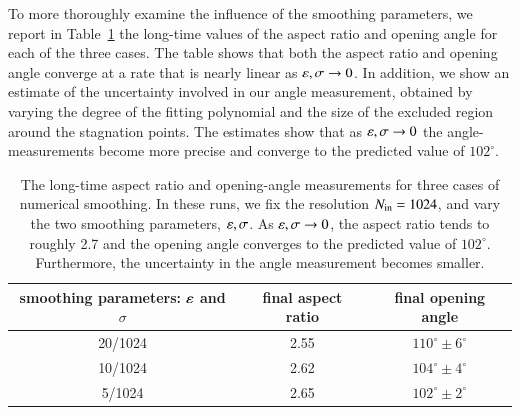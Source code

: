 \documentclass[preprint, 10pt]{elsarticle}
\begin{document}
To more thoroughly examine the influence of the smoothing parameters, we report in Table~\ref{table:arangle} the long-time values of the aspect ratio and opening angle for each of the three cases. The table shows that both the aspect ratio and opening angle converge at a rate that is nearly linear as $\varepsilon, \sigma \to 0$. In addition, we show an estimate of the uncertainty involved in our angle measurement, obtained by varying the degree of the fitting polynomial and the size of the excluded region around the stagnation points. The estimates show that as $\varepsilon, \sigma \to 0$ the angle-measurements become more precise and converge to the predicted value of $102^{\circ}$.  

\begin{table}%
\begin{center}
\caption{The long-time aspect ratio and opening-angle measurements for three cases of numerical smoothing. In these runs, we fix the resolution $N_{\mathrm{in}} = 1024$, and vary the two smoothing parameters, $\varepsilon, \sigma$. As $\varepsilon, \sigma \to 0$, the aspect ratio tends to roughly 2.7 and the opening angle converges to the predicted value of $102^{\circ}$. Furthermore, the uncertainty in the angle measurement becomes smaller.
} 
\vspace{0.3 pc}
\label{table:arangle}
\begin{tabular}{c c c}
\hline
\hspace{0.5pc} smoothing parameters: $\varepsilon$ and $\sigma$
\hspace{0.5pc} & final aspect ratio 
\hspace{0.5pc} & final opening angle \\
\hline
20/1024		& 2.55	& $110^\circ \pm 6^\circ$	\\
10/1024		& 2.62	& $104^\circ \pm 4^\circ$	\\
5/1024		& 2.65	& $102^\circ \pm 2^\circ$	\\
\hline
\end{tabular}
\end{center}
\end{table}
\end{document}
